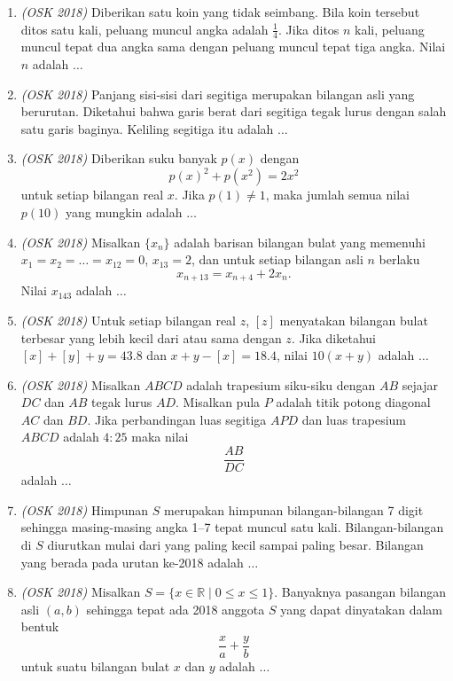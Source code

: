 \begin{enumerate}
	\item \textit{(OSK 2018)}  Diberikan satu koin yang tidak seimbang. Bila koin tersebut ditos satu kali, peluang muncul angka adalah $\frac{1}{4}$. Jika ditos $n$ kali, peluang muncul tepat dua angka sama dengan peluang muncul tepat tiga angka. Nilai $n$ adalah $\dots$
	
	\item \textit{(OSK 2018)}  Panjang sisi-sisi dari segitiga merupakan bilangan asli yang berurutan. Diketahui bahwa garis berat dari segitiga tegak lurus dengan salah satu garis baginya. Keliling segitiga itu adalah $\dots$
	
	\item \textit{(OSK 2018)}  Diberikan suku banyak $p(x)$ dengan
	\[
	p(x)^2 + p(x^2) = 2x^2
	\]
	untuk setiap bilangan real $x$. Jika $p(1) \ne 1$, maka jumlah semua nilai $p(10)$ yang mungkin adalah $\dots$
	
	\item \textit{(OSK 2018)} Misalkan $\{x_n\}$ adalah barisan bilangan bulat yang memenuhi  
	$x_1 = x_2 = \dots = x_{12} = 0$, $x_{13} = 2$, dan untuk setiap bilangan asli $n$ berlaku
	\[
	x_{n+13} = x_{n+4} + 2x_n.
	\]
	Nilai $x_{143}$ adalah $\dots$
	
	\item \textit{(OSK 2018)} Untuk setiap bilangan real $z$, $[z]$ menyatakan bilangan bulat terbesar yang lebih kecil dari atau sama dengan $z$.  
	Jika diketahui $[x] + [y] + y = 43.8$ dan $x + y - [x] = 18.4$, nilai $10(x + y)$ adalah $\dots$
	
	\item \textit{(OSK 2018)} Misalkan $ABCD$ adalah trapesium siku-siku dengan $AB$ sejajar $DC$ dan $AB$ tegak lurus $AD$.  
	Misalkan pula $P$ adalah titik potong diagonal $AC$ dan $BD$.  
	Jika perbandingan luas segitiga $APD$ dan luas trapesium $ABCD$ adalah $4 : 25$ maka nilai
	\[
	\frac{AB}{DC}
	\]
	adalah $\dots$
	
	\item \textit{(OSK 2018)} Himpunan $S$ merupakan himpunan bilangan-bilangan 7 digit sehingga masing-masing angka 1--7 tepat muncul satu kali.  
	Bilangan-bilangan di $S$ diurutkan mulai dari yang paling kecil sampai paling besar.  
	Bilangan yang berada pada urutan ke-2018 adalah $\dots$
	
	\item \textit{(OSK 2018)} Misalkan $S = \{x \in \mathbb{R} \mid 0 \le x \le 1\}$.  
	Banyaknya pasangan bilangan asli $(a,b)$ sehingga tepat ada 2018 anggota $S$ yang dapat dinyatakan dalam bentuk
	\[
	\frac{x}{a} + \frac{y}{b}
	\]
	untuk suatu bilangan bulat $x$ dan $y$ adalah $\dots$
	

\end{enumerate}
